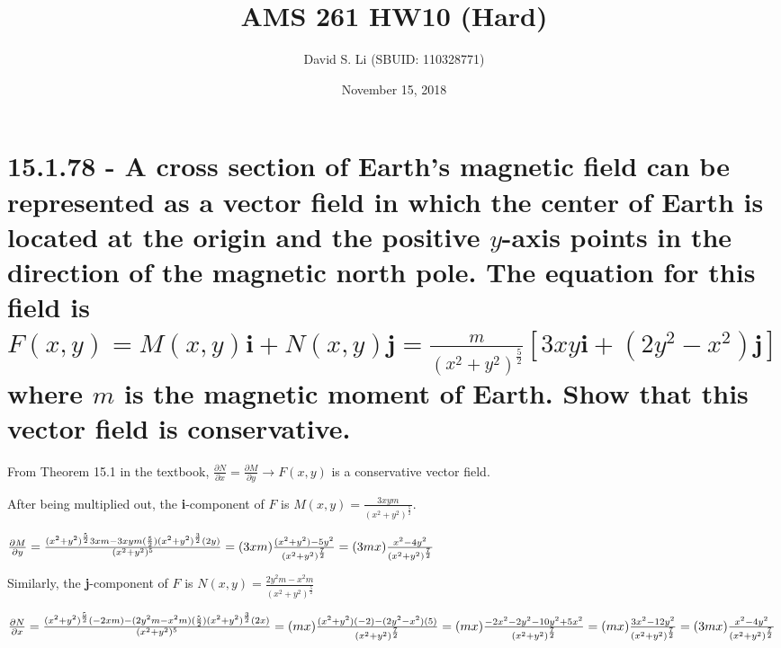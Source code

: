 \documentclass{article}
\title{AMS 261 HW10 (Hard)}
\author{David S. Li (SBUID: 110328771)}
\date{November 15, 2018}
\begin{document}
\maketitle

\section{15.1.78 - A cross section of Earth's magnetic field can be represented as a vector field in which the center of Earth is located at the origin and the positive $y$-axis points in the direction of the magnetic north pole.  The equation for this field is $F(x, y) = M(x, y)\textbf{i} + N(x, y)\textbf{j} = \frac{m}{(x^{2} + y^{2})^{\frac{5}{2}}}[3xy\textbf{i} + (2y^{2} - x^{2})\textbf{j}]$ where $m$ is the magnetic moment of Earth.  Show that this vector field is conservative.}

\par\noindent\Large From Theorem 15.1 in the textbook, $\frac{\partial N}{\partial x} = \frac{\partial M}{\partial y} \rightarrow F(x, y)$ is a conservative vector field.\vspace{0.25cm}

\par\noindent\Large After being multiplied out, the \textbf{i}-component of $F$ is $M(x, y) = \frac{3xym}{(x^{2} + y^{2})^{\frac{5}{2}}}$.
\par\noindent\huge $\frac{\partial M}{\partial y} = \frac{(x^{2} + y^{2})^{\frac{5}{2}}3xm - 3xym(\frac{5}{2})(x^{2} + y^{2})^{\frac{3}{2}}(2y)}{(x^{2} + y^{2})^{5}} = (3xm)\frac{(x^{2} + y^{2}) - 5y^{2}}{(x^{2} + y^{2})^{\frac{7}{2}}} = \linebreak (3mx)\frac{x^{2} - 4y^{2}}{(x^{2} + y^{2})^{\frac{7}{2}}}$\vspace{0.25cm}

\par\noindent\Large Similarly, the \textbf{j}-component of $F$ is $N(x, y) =$\huge $\frac{2y^{2}m - x^{2}m}{(x^{2} + y^{2})^{\frac{5}{2}}}$
\par\noindent\huge $\frac{\partial N}{\partial x} = \frac{(x^{2} + y^{2})^{\frac{5}{2}}(-2xm) - (2y^{2}m - x^{2}m)(\frac{5}{2})(x^{2} + y^{2})^{\frac{3}{2}}(2x)}{(x^{2} + y^{2})^{5}} = (mx)\frac{(x^{2} + y^{2})(-2) - (2y^{2} - x^{2})(5)}{(x^{2} + y^{2})^{\frac{7}{2}}}\linebreak = (mx)\frac{-2x^{2} - 2y^{2} - 10y^{2} + 5x^{2}}{(x^{2} + y^{2})^{\frac{7}{2}}} = (mx)\frac{3x^{2} - 12y^{2}}{(x^{2} + y^{2})^{\frac{7}{2}}} = (3mx)\frac{x^{2} - 4y^{2}}{(x^{2} + y^{2})^{\frac{7}{2}}}$\vspace{0.25cm}
\end{document}
